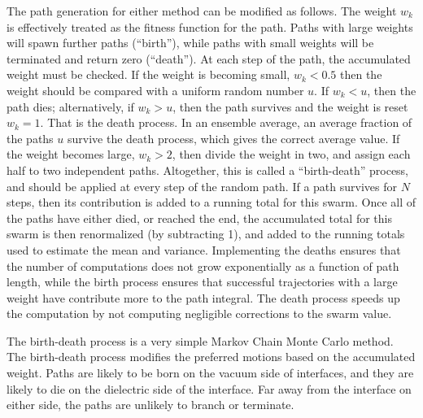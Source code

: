 The path generation for either method can be modified as follows.  The weight $w_k$ is effectively treated as 
the fitness function for the path.  Paths with large weights will spawn further paths (``birth''), while paths with
small weights will be terminated and return zero (``death'').  At each step of the path, the 
accumulated weight must be checked.
If the weight is becoming small, $w_k<0.5$ then the weight should be compared with a uniform random number $u$.
If $w_k<u$, then the path dies; alternatively, if $w_k>u$, then 
the path survives and the weight is reset $w_k=1$.  That is the death process.
In an ensemble average, an average fraction of the paths $u$ survive the death process, which gives 
the correct average value.
If the weight becomes large, $w_k>2$, then divide the weight in two, and assign each half to 
two independent paths.
Altogether, this is called a ``birth-death'' process, and should be applied at every step of the random path.
If a path survives for $N$ steps, then its contribution is added to a running total for this swarm.
Once all of the paths have either died, or reached the end, the accumulated total for this swarm is then
renormalized (by subtracting 1), and added to the running totals used to estimate the mean and variance.  
Implementing the deaths ensures that the number of computations  does not grow exponentially as a function 
of path length, while the birth process ensures that successful trajectories with a large weight have 
contribute more to the path integral.  The death process speeds up the computation by not computing 
negligible corrections to the swarm value.  

The birth-death process is a very simple Markov Chain Monte Carlo method.  The birth-death
process modifies the preferred motions based on the accumulated weight.  Paths are likely to be born
on the vacuum side of interfaces, and they are likely to die on the dielectric side of the interface.
Far away from the interface on either side, the paths are unlikely to branch or terminate.  

